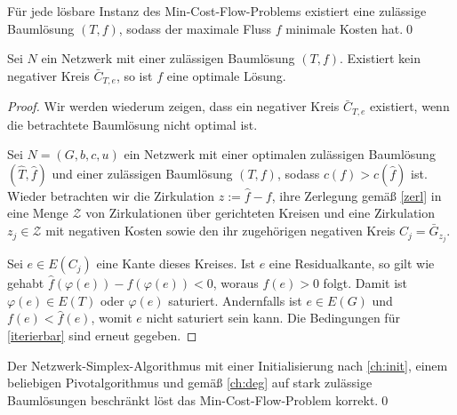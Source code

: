 \begin{kor}Für jede lösbare Instanz des Min-Cost-Flow-Problems existiert eine zulässige Baumlösung $(T,f)$, sodass der maximale Fluss $f$ minimale Kosten hat.\qed\end{kor}

\begin{thm}\label{opt2}Sei $N$ ein Netzwerk mit einer zulässigen Baumlösung $(T,f)$. Existiert kein negativer Kreis $\bar{C}_{T,e}$, so ist $f$ eine optimale Lösung.\end{thm}
\begin{proof}Wir werden wiederum zeigen, dass ein negativer Kreis $\bar{C}_{T,e}$ existiert, wenn die betrachtete Baumlösung nicht optimal ist.

Sei $N=(G,b,c,u)$ ein Netzwerk mit einer optimalen zulässigen Baumlösung $(\hat{T},\hat{f})$ und einer zulässigen Baumlösung $(T,f)$, sodass $c(f)>c(\hat{f})$ ist. Wieder betrachten wir die Zirkulation $z:=\hat{f}-f$, ihre Zerlegung gemäß \cref{zerl} in eine Menge $\mathscr{Z}$ von Zirkulationen über gerichteten Kreisen und eine Zirkulation $z_j\in\mathscr{Z}$ mit negativen Kosten sowie den ihr zugehörigen negativen Kreis $C_j=\bar{G}_{z_j}$.

Sei $e\in E(C_j)$ eine Kante dieses Kreises. Ist $e$ eine Residualkante, so gilt wie gehabt $\hat{f}(\varphi(e))-f(\varphi(e))<0$, woraus $f(e)>0$ folgt. Damit ist $\varphi(e)\in E(T)$ oder $\varphi(e)$ saturiert. Andernfalls ist $e\in E(G)$ und $f(e)<\hat{f}(e)$, womit $e$ nicht saturiert sein kann. Die Bedingungen für \cref{iterierbar} sind erneut gegeben.\end{proof}

\begin{kor}Der Netzwerk-Simplex-Algorithmus mit einer Initialisierung nach \cref{ch:init}, einem beliebigen Pivotalgorithmus und gemäß \cref{ch:deg} auf stark zulässige Baumlösungen beschränkt löst das Min-Cost-Flow-Problem korrekt.\qed\end{kor}
